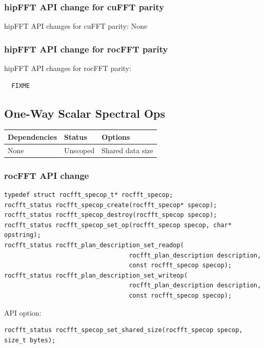 \documentclass[12pt]{article}
\renewcommand{\(}{\left(}
\renewcommand{\)}{\right)}
\begin{document}
\subsubsection{hipFFT API change for cuFFT parity}
\noindent
hipFFT API changes for cuFFT parity: None

\subsubsection{hipFFT API change for rocFFT parity}
\noindent
hipFFT API changes for rocFFT parity: 
\begin{lstlisting}
  FIXME
\end{lstlisting}



\newpage
\subsection{One-Way Scalar Spectral Ops}
\label{sss1wayspecops}

\begin{center}
  \begin{tabular}{|l|l|l|}
    \hline
    Dependencies & Status & Options \\
    \hline
    None & Unscoped   & Shared data size \\
    \hline
  \end{tabular}
\end{center}
\noindent

\subsubsection{rocFFT API change}
\begin{lstlisting}
typedef struct rocfft_specop_t* rocfft_specop;
rocfft_status rocfft_specop_create(rocfft_specop* specop);
rocfft_status rocfft_specop_destroy(rocfft_specop specop);
rocfft_status rocfft_specop_set_op(rocfft_specop specop, char* opstring);
rocfft_status rocfft_plan_description_set_readop(
                                  rocfft_plan_description description,
                                  const rocfft_specop specop);
rocfft_status rocfft_plan_description_set_writeop(
                                  rocfft_plan_description description,
                                  const rocfft_specop specop);
\end{lstlisting}
API option:
\begin{lstlisting}
rocfft_status rocfft_specop_set_shared_size(rocfft_specop specop, size_t bytes);
\end{lstlisting}
\end{document}
